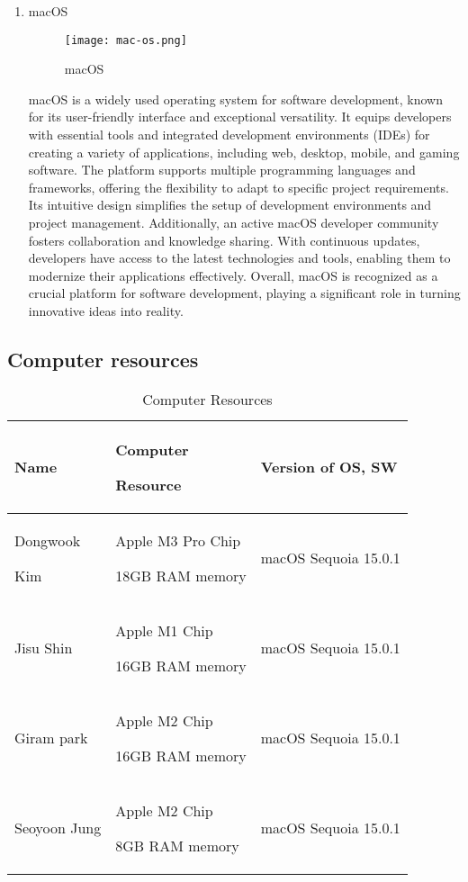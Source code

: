\documentclass[conference]{IEEEtran}
\begin{document}
\begin{enumerate}[itemsep=2ex, parsep=1ex]
	      \vspace{5cm}
	      	      	      
	\item macOS
	      	      	              
	      \begin{figure}[h!]
	      	\centering
	      	\texttt{[image: mac-os.png]}
	      	\caption{macOS}
	      	\label{fig:macOS}
	      \end{figure}
	      	      	      
	      macOS is a widely used operating system for software development, known for
	      its user-friendly interface and exceptional versatility. It equips
	      developers with essential tools and integrated development environments (IDEs)
	      for creating a variety of applications, including web, desktop, mobile,
	      and gaming software. The platform supports multiple programming languages and
	      frameworks, offering the flexibility to adapt to specific project
	      requirements. Its intuitive design simplifies the setup of development environments
	      and project management. Additionally, an active macOS developer community fosters
	      collaboration and knowledge sharing. With continuous updates, developers have
	      access to the latest technologies and tools, enabling them to modernize
	      their applications effectively. Overall, macOS is recognized as a crucial
	      platform for software development, playing a significant role in turning innovative
	      ideas into reality.
\end{enumerate}

\subsection{Computer resources}

\begin{table}[h!]
	\caption{Computer Resources}
	\def\arraystretch{1.4} \small
	\begin{tabular}{|p{1.8cm}|p{2.7cm}|p{3.1cm}|}
		\hline
		Name              & Computer \par Resource                 & Version of OS, SW    \\
		\hline
		Dongwook \par Kim & Apple M3 Pro Chip \par 18GB RAM memory & macOS Sequoia 15.0.1 \\
		\hline
		Jisu Shin         & Apple M1 Chip \par 16GB RAM memory     & macOS Sequoia 15.0.1 \\
		\hline
		Giram park        & Apple M2 Chip \par 16GB RAM memory     & macOS Sequoia 15.0.1 \\
		\hline
		Seoyoon Jung      & Apple M2 Chip \par 8GB RAM memory      & macOS Sequoia 15.0.1 \\
		\hline
	\end{tabular}
\end{table}
\end{document}
